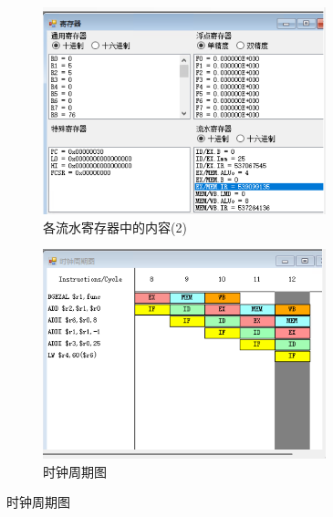 \documentclass[a4paper,twoside]{article}
\begin{document}
\begin{spacing}{1.2}
\begin{figure}[htb]
\begin{subfigure}[b]{0.4\textwidth}
		\includegraphics[width=0.9\textwidth]{images/t13reg2.png}
		\caption{各流水寄存器中的内容(2)}
		\label{fig:t13reg}
	\end{subfigure}
	\begin{subfigure}[b]{0.4\textwidth}
		\centering
		\includegraphics[width=0.9\textwidth]{images/t13clock.png}
		\caption{时钟周期图}
		\label{fig:t13clock}
	\end{subfigure}
\end{figure}


\end{spacing}
\end{document}
